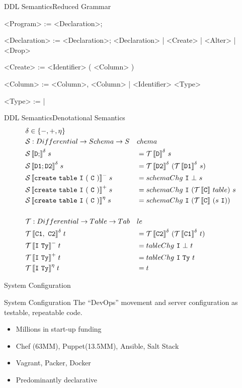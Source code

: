 \documentclass{beamer}
\newcommand{\cmp}[2]{
  \mathcal{#1}\,|[ \mathtt{ \StrSubstitute{#2}{ }{\ } } |]
}
\begin{document}
\begin{frame}[fragile]{DDL Semantics}{Reduced Grammar}
  \begin{grammar}
    <Program> := <Declaration>;

    <Declaration> := <Declaration>; <Declaration> | <Create> | <Alter> | <Drop>

    <Create> :=  <Identifier> ( <Column> )

    <Column> := <Column>, <Column> | <Identifier> <Type>

    <Type> :=  | 
  \end{grammar}
\end{frame}

\begin{frame}[fragile]{DDL Semantics}{Denotational Semantics}
  \footnotesize
  \begin{alignat*}{2}
  &\delta \in \{-, +, \eta \} &&\\
  &\mathcal{S} : Differential -> Schema -> S&&chema \\
  &\cmp{S}{D;}^{\delta}\; s &&= \cmp{T}{D}^{\delta}\ s \\
  &\cmp{S}{D1;D2}^{\delta}\; s &&= \cmp{T}{D2}^{\delta}\ (\cmp{T}{D1}^{\delta}\ s) \\
  &\cmp{S}{create table I ( C )}^{-}\; s &&= schemaChg\ \mathtt{I}\ \bot\ s\\
  &\cmp{S}{create table I ( C )}^{+}\; s &&= schemaChg\ \mathtt{I}\ (\cmp{T}{C}\ table) \ s \\
  &\cmp{S}{create table I ( C )}^{\eta}\; s &&= schemaChg\ \mathtt{I}\ (\cmp{T}{C}\ (s\ \mathtt{I})) \\
\\
  &\mathcal{T} : Differential -> Table -> Tab&&le\\
  &\cmp{T}{C1, C2}^{\delta}\; t &&= \cmp{T}{C2}^{\delta}\ (\cmp{T}{C1}^{\delta}\ t) \\
  &\cmp{T}{I Ty}^{-}\; t &&= tableChg\ \mathtt{I}\ \bot\ t\\
  &\cmp{T}{I Ty}^{+}\; t &&= tableChg\ \mathtt{I}\ \mathtt{Ty}\ t\\
  &\cmp{T}{I Ty}^{\eta}\; t &&= t \\
  \end{alignat*}
  \normalsize
\end{frame}

\begin{frame}[fragile]{System Configuration}
  \begin{block}{System Configuration}
    The ``DevOps'' movement and server configuration as testable, repeatable code.
  \end{block}

  \begin{itemize}
    \item Millions in start-up funding
    \item Chef (63MM), Puppet(13.5MM), Ansible, Salt Stack
    \item Vagrant, Packer, Docker
    \item Predominantly declarative
  \end{itemize}
\end{frame}
\end{document}
